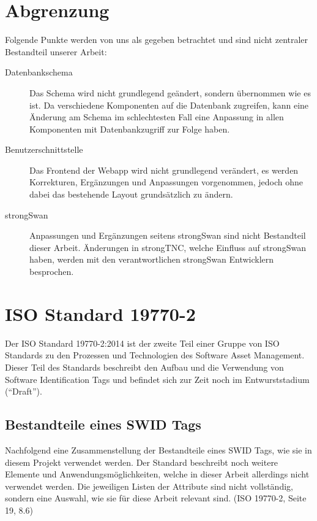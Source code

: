 \section{Abgrenzung}
Folgende Punkte werden von uns als gegeben betrachtet und sind nicht zentraler
Bestandteil unserer Arbeit:

\begin{description}
	\item[Datenbankschema] Das Schema wird nicht grundlegend geändert, sondern
	übernommen wie es ist. Da verschiedene Komponenten auf die Datenbank zugreifen,
	kann eine Änderung am Schema im schlechtesten Fall eine Anpassung in allen
	Komponenten mit Datenbankzugriff zur Folge haben.

	\item[Benutzerschnittstelle] Das Frontend der Webapp wird nicht grundlegend
	verändert, es werden Korrekturen, Ergänzungen und Anpassungen vorgenommen,
	jedoch ohne dabei das bestehende Layout grundsätzlich zu ändern.

	\item[strongSwan] Anpassungen und Ergänzungen seitens strongSwan sind nicht
	Bestandteil dieser Arbeit. Änderungen in strongTNC, welche Einfluss auf
	strongSwan haben, werden mit den verantwortlichen strongSwan Entwicklern
	besprochen.
\end{description}

\section{ISO Standard 19770-2} 
Der ISO Standard 19770-2:2014 ist der zweite Teil einer Gruppe von ISO Standards
zu den Prozessen und Technologien des Software Asset Management. Dieser Teil des
Standards beschreibt den Aufbau und die Verwendung von Software Identification
Tags und befindet sich zur Zeit noch im Entwurststadium (\enquote{Draft}).

\subsection{Bestandteile eines SWID Tags}
Nachfolgend eine Zusammenstellung der Bestandteile eines SWID Tags, wie sie in
diesem Projekt verwendet werden. Der Standard beschreibt noch weitere Elemente
und Anwendungsmöglichkeiten, welche in dieser Arbeit allerdings nicht verwendet
werden. Die jeweiligen Listen der Attribute sind nicht vollständig, sondern eine
Auswahl, wie sie für diese Arbeit relevant sind. (ISO
19770-2\cite{iso19770-2}, Seite 19, 8.6)

